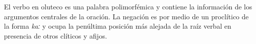El verbo en oluteco es una palabra polimorfémica \textcolor{MidnightBlue}{\citep{Oluteco}} y contiene la información de los argumentos centrales de la oración. La negación es por medio de un proclítico de la forma {\setmainfont{Charis SIL} \textit{kaː}} y ocupa la penúltima posición más alejada de la raíz verbal en presencia de otros clíticos y afijos.